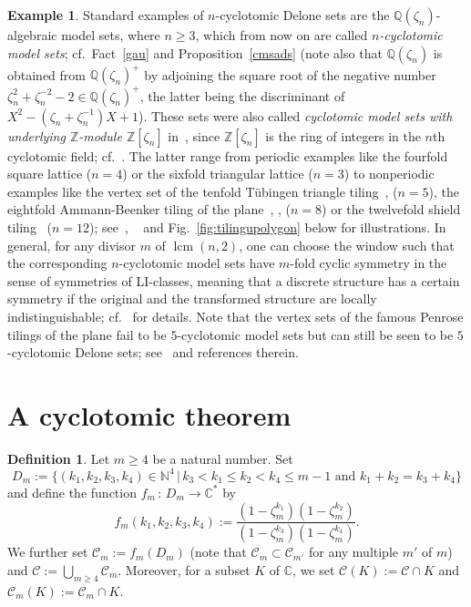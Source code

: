 \documentclass[a4paper]{amsart}
\theoremstyle{definition}
\newtheorem{defi}[theorem]{Definition}
\newtheorem{ex}[theorem]{Example}
\numberwithin{equation}{section}
\numberwithin{theorem}{section}
\begin{document}
\begin{ex}\label{algex}
Standard examples of $n$-cyclotomic Delone sets are the ${\mathbb{Q}}(\zeta_n)$-algebraic
  model sets, where $n\geq 3$, which from now on are called {\em $n$-cyclotomic
  model sets}; cf.~Fact~\ref{gau} and Proposition~\ref{cmsads} (note
also that ${\mathbb{Q}}(\zeta_n)$ is obtained from ${\mathbb{Q}}(\zeta_n)^+$ by adjoining
the square root of the negative number $\zeta_n^2+\zeta_n^{-2}-2\in
{\mathbb{Q}}(\zeta_n)^+$, the latter being the discriminant of $X^2-(\zeta_n+\zeta_n^{-1})X+1$). These sets were also called {\em cyclotomic model sets with underlying
${\mathbb{Z}}$-module ${\mathbb{Z}}[\zeta_n]$} in~\cite[Sec.~4.5]{H5}, since ${\mathbb{Z}}[\zeta_n]$
is the ring of integers in the $n$th cyclotomic field;
cf.~\cite[Thm.~ 2.6]{Wa}. The latter 
range from periodic examples like the fourfold square lattice ($n=4$)
or the sixfold triangular lattice ($n=3$) to nonperiodic
examples like the vertex set of the tenfold T\"ubingen triangle
tiling~\cite{bk1},  \cite{bk2} ($n=5$), the eightfold Ammann-Beenker tiling
of the plane~\cite{am},  \cite{bj},  \cite{ga} ($n=8$) or the twelvefold
shield tiling~\cite{ga}
($n=12$);
see~\cite[Fig.~1]{H4}, ~\cite[Fig.~2]{H5} and Fig.~\ref{fig:tilingupolygon} below for
illustrations. In general, for any divisor $m$ 
  of $\operatorname{lcm}(n,2)$, one can choose the window such that the
corresponding $n$-cyclotomic
  model sets have $m$-fold cyclic symmetry in the
  sense of symmetries of LI-classes, meaning that a discrete structure
  has a certain symmetry if the original and the transformed structure
  are locally indistinguishable; cf.~\cite{B} for details. Note that  the vertex sets of the famous Penrose tilings of the
plane fail to be $5$-cyclotomic model sets but can still be seen to be $5$-cyclotomic Delone sets; see~\cite{bh}
and references therein. 
\end{ex}

\section{A cyclotomic theorem}\label{cyc}

\begin{defi}\label{fmddefi}
Let $m\geq 4$ be a natural number. Set
$$
D_{m}:=\big\{(k_1,k_2,k_3,k_4)\in \mathbb{N}^4 \,\big|\, k_3<k_1\leq
k_2<k_4\leq m-1 \mbox{ and } k_1+k_2=k_3+k_4\big\}
$$ 
and define the function $f_{m}\,:\, D_{m}\rightarrow {\mathbb{C}}^*$ by
\begin{equation}\label{fmd}
f_{m}(k_1,k_2,k_3,k_4):=\frac{(1-\zeta_{m}^{k_1})(1-\zeta_{m}^{k_2})}{(1-\zeta_{m}^{k_3})(1-\zeta_{m}^{k_4})}.
\end{equation}
We further set $\mathcal{C}_m:=f_m(D_m)$ (note that $\mathcal{C}_m\subset
\mathcal{C}_{m'}$ for any multiple $m'$ of $m$) and
$\mathcal{C}:=\bigcup_{m\geq 4}\mathcal{C}_m$. Moreover, for a subset 
$K$ of ${\mathbb{C}}$, we set $\mathcal{C}(K):=\mathcal{C}\cap K$ and
$\mathcal{C}_m(K):=\mathcal{C}_m\cap K$.
\end{defi}
\end{document}
